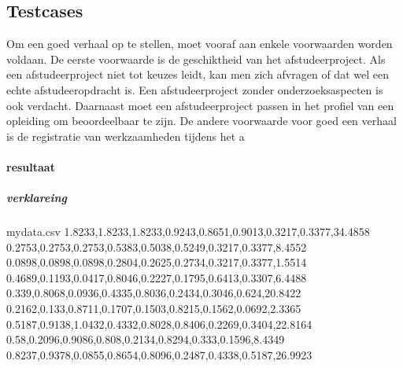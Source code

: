 %
%
%








\subsection{Testcases}		

Om een goed verhaal op te stellen, moet vooraf aan enkele voorwaarden
worden voldaan. De eerste voorwaarde is de geschiktheid van het
afstudeerproject. Als een afstudeerproject niet tot keuzes leidt, kan
men zich afvragen of dat wel een echte afstudeeropdracht is. Een
afstudeerproject zonder onderzoeksaspecten is ook verdacht. Daarnaast
moet een afstudeerproject passen in het profiel van een opleiding om
beoordeelbaar te zijn. De andere voorwaarde voor goed een verhaal is
de registratie van werkzaamheden tijdens het a

 
\paragraph{resultaat}


 
 
 
 
\subparagraph{verklareing}


\begin{filecontents*}{mydata.csv}
	1.8233,1.8233,1.8233,0.9243,0.8651,0.9013,0.3217,0.3377,34.4858
	0.2753,0.2753,0.2753,0.5383,0.5038,0.5249,0.3217,0.3377,8.4552
	0.0898,0.0898,0.0898,0.2804,0.2625,0.2734,0.3217,0.3377,1.5514
	0.4689,0.1193,0.0417,0.8046,0.2227,0.1795,0.6413,0.3307,6.4488
	0.339,0.8068,0.0936,0.4335,0.8036,0.2434,0.3046,0.624,20.8422
	0.2162,0.133,0.8711,0.1707,0.1503,0.8215,0.1562,0.0692,2.3365
	0.5187,0.9138,1.0432,0.4332,0.8028,0.8406,0.2269,0.3404,22.8164
	0.58,0.2096,0.9086,0.808,0.2134,0.8294,0.333,0.1596,8.4349
	0.8237,0.9378,0.0855,0.8654,0.8096,0.2487,0.4338,0.5187,26.9923 
\end{filecontents*}

